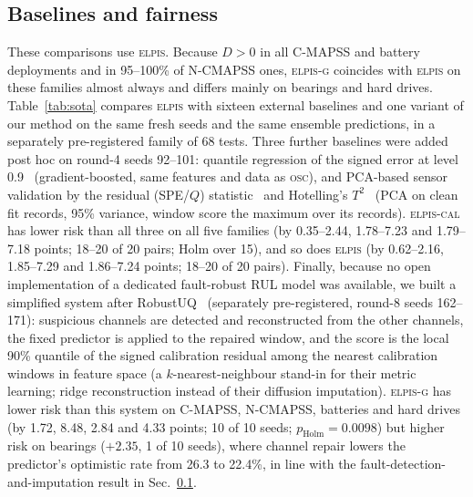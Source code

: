 \documentclass{esannV2}
\newcommand{\OSC}{\textsc{osc}}
\newcommand{\RPT}{\textsc{elpis}}
\newcommand{\AUTO}{\textsc{elpis-cal}}
\newcommand{\AUTOD}{\textsc{elpis-g}}
\begin{document}
\subsection{Baselines and fairness}\label{sec:fair}
These comparisons use \RPT. Because $D>0$ in all C-MAPSS and battery deployments and in 95--100\% of N-CMAPSS ones, \AUTOD{} coincides with \RPT{} on these families almost always and differs mainly on bearings and hard drives. Table~\ref{tab:sota} compares \RPT{} with sixteen external baselines and one variant of our method on the same fresh seeds and the same ensemble predictions, in a separately pre-registered family of 68 tests. Three further baselines were added post hoc on round-4 seeds 92--101: quantile regression of the signed error at level 0.9~\cite{koenker1978regression} (gradient-boosted, same features and data as \OSC), and PCA-based sensor validation by the residual (SPE/$Q$) statistic~\cite{jackson1979control} and Hotelling's $T^2$~\cite{macgregor1995statistical} (PCA on clean fit records, 95\% variance, window score the maximum over its records). \AUTO{} has lower risk than all three on all five families (by 0.35--2.44, 1.78--7.23 and 1.79--7.18 points; 18--20 of 20 pairs; Holm over 15), and so does \RPT{} (by 0.62--2.16, 1.85--7.29 and 1.86--7.24 points; 18--20 of 20 pairs). Finally, because no open implementation of a dedicated fault-robust RUL model was available, we built a simplified system after RobustUQ~\cite{wang2025robustuq} (separately pre-registered, round-8 seeds 162--171): suspicious channels are detected and reconstructed from the other channels, the fixed predictor is applied to the repaired window, and the score is the local 90\% quantile of the signed calibration residual among the nearest calibration windows in feature space (a $k$-nearest-neighbour stand-in for their metric learning; ridge reconstruction instead of their diffusion imputation). \AUTOD{} has lower risk than this system on C-MAPSS, N-CMAPSS, batteries and hard drives (by 1.72, 8.48, 2.84 and 4.33 points; 10 of 10 seeds; $p_{\text{Holm}}=0.0098$) but higher risk on bearings ($+2.35$, 1 of 10 seeds), where channel repair lowers the predictor's optimistic rate from 26.3 to 22.4\%, in line with the fault-detection-and-imputation result in Sec.~\ref{sec:fair}.
\end{document}
